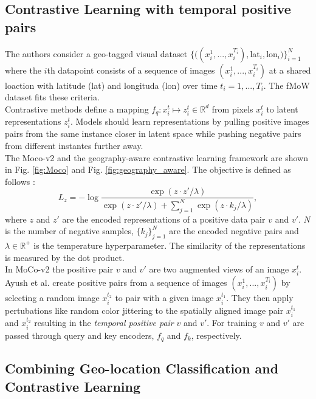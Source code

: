\subsection{Contrastive Learning with temporal positive pairs}

The authors consider a geo-tagged visual dataset $\{((x_i^1, ..., x_i^{T_i}), $lat$_i, $lon$_i)\}_{i=1}^N$ where the $i$th datapoint consists of a sequence of images $(x_i^1, ..., x_i^{T_i})$ at a shared loaction with latitude (lat) and longituda (lon) over time $t_i = 1, ..., T_i$. The fMoW dataset fits these criteria. \\
Contrastive methods define a mapping $f_q: x_i^t \mapsto z_i^t \in \mathbb{R}^d$ from pixels $x_i^t$ to latent representations $z_i^t$. Models should learn representations by pulling positive images pairs from the same instance closer in latent space while pushing negative pairs from different instantes further away. \\
The Moco-v2 and the geography-aware contrastive learning framework are shown in Fig. \ref{fig:Moco} and Fig. \ref{fig:geography_aware}.
The objective is defined as follows \cite{geoAwareSelfSuper}:
\begin{equation}
    \label{eq:contrastive_loss}
    L_z = - \log\frac{\exp(z\cdot z'/\lambda)}{\exp(z\cdot z'/\lambda) + \sum_{j=1}^N \exp(z\cdot k_j/\lambda)},
\end{equation}
where $z$ and $z'$ are the encoded representations of a positive data pair $v$ and $v'$. $N$ is the number of negative samples, $\{k_j\}_{j=1}^N$ are the encoded negative pairs and $\lambda\in\mathbb{R}^+$ is the temperature hyperparameter. The similarity of the representations is measured by the dot product. \\
In MoCo-v2 the positive pair $v$ and $v'$ are two augmented views of an image $x_i^t$. Ayush et al. \cite{geoAwareSelfSuper} create positive pairs from a sequence of images $(x_i^1, ..., x_i^{T_i})$ by selecting a random image $x_i^{t_2}$ to pair with a given image $x_i^{t_1}$. They then apply pertubations like random color jittering to the spatially aligned image pair $x_i^{t_1}$ and $x_i^{t_2}$ resulting in the \textit{temporal positive pair} $v$ and $v'$. For training $v$ and $v'$ are passed through query and key encoders, $f_q$ and $f_k$, respectively.

\subsection{Combining Geo-location Classification and Contrastive Learning}

